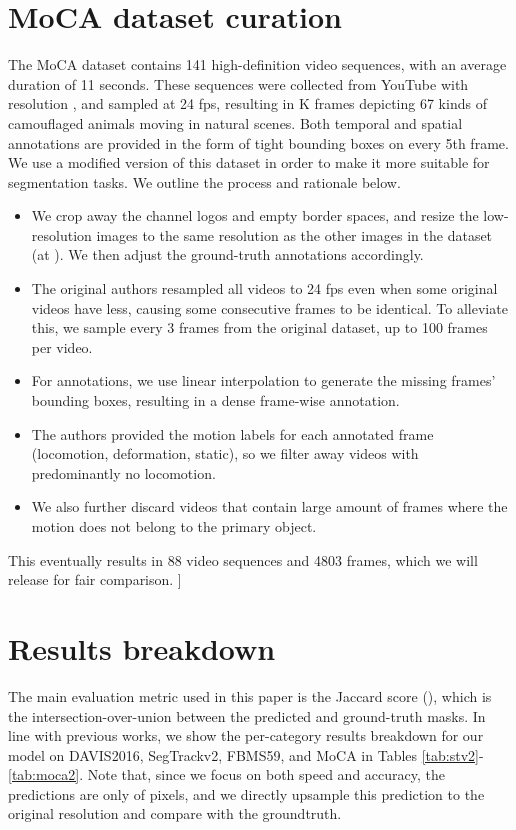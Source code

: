 \section{MoCA dataset curation}
The MoCA dataset
contains 141 high-definition video sequences, 
with an average duration of 11 seconds. These sequences were collected from YouTube with resolution , and sampled at 24 fps, resulting in K frames
depicting 67 kinds of camouflaged animals moving in natural scenes. 
Both temporal and spatial annotations are provided in the form of tight bounding boxes on every 5th frame. We use a modified version of this dataset in order to make it more suitable for segmentation tasks. 
We outline the process and rationale below.
\begin{itemize}
    \vspace{-0.2cm}\item We crop away the channel logos and empty border spaces, and resize the low-resolution images to the same resolution as the other images in the dataset (at ).
    We then adjust the ground-truth annotations accordingly.
    \vspace{-0.2cm}\item The original authors resampled all videos to 24 fps even when some original videos have less, causing some consecutive frames to be identical. To alleviate this, we sample every 3 frames from the original dataset, up to 100 frames per video. 
    \vspace{-0.2cm}\item For annotations, we use linear interpolation to generate the missing frames' bounding boxes, 
    resulting in a dense frame-wise annotation. 
    \vspace{-0.2cm}\item The authors provided the motion labels for each annotated frame (locomotion, deformation, static), so we filter away videos with predominantly no locomotion. 
    \vspace{-0.2cm}\item We also further discard videos that contain large amount of frames where the motion does not belong to the primary object. 
\end{itemize}
This eventually results in 88 video sequences and 4803 frames, 
which we will release for fair comparison. \-10pt]


\section{Results breakdown}
The main evaluation metric used in this paper is the Jaccard score (), which is the intersection-over-union between the predicted and ground-truth masks.
In line with previous works, 
we show the per-category results breakdown for our model on DAVIS2016, SegTrackv2, FBMS59, and MoCA in Tables \ref{tab:stv2}-\ref{tab:moca2}.
Note that, since we focus on both speed and accuracy,
the predictions are only of  pixels, 
and we directly upsample this prediction to the original resolution and compare with the groundtruth. 
